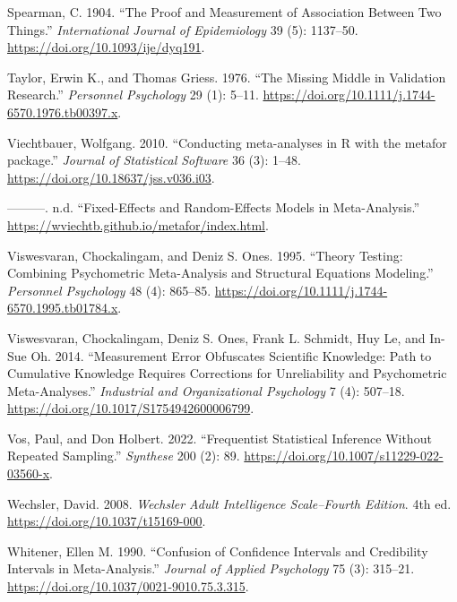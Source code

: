 \documentclass[
  letterpaper,
  DIV=11,
  numbers=noendperiod]{scrreprt}
\newlength{\cslhangindent}
\newlength{\cslentryspacingunit} %
\newenvironment{CSLReferences}[2] %
 {%
  \setlength{\parindent}{0pt}
  \ifodd #1
  \let\oldpar\par
  \def\par{\hangindent=\cslhangindent\oldpar}
  \fi
  \setlength{\parskip}{#2\cslentryspacingunit}
 }%
 {}
\begin{document}
\begin{CSLReferences}{1}{0}
\leavevmode{}%
Spearman, C. 1904. {``The Proof and Measurement of Association Between
Two Things.''} \emph{International Journal of Epidemiology} 39 (5):
1137--50. \url{https://doi.org/10.1093/ije/dyq191}.

\leavevmode{}%
Taylor, Erwin K., and Thomas Griess. 1976. {``The Missing Middle in
Validation Research.''} \emph{Personnel Psychology} 29 (1): 5--11.
\url{https://doi.org/10.1111/j.1744-6570.1976.tb00397.x}.

\leavevmode{}%
Viechtbauer, Wolfgang. 2010. {``Conducting meta-analyses in R with the
metafor package.''} \emph{Journal of Statistical Software} 36 (3):
1--48. \url{https://doi.org/10.18637/jss.v036.i03}.

\leavevmode{}%
---------. n.d. {``Fixed-Effects and Random-Effects Models in
Meta-Analysis.''} \url{https://wviechtb.github.io/metafor/index.html}.

\leavevmode{}%
Viswesvaran, Chockalingam, and Deniz S. Ones. 1995. {``Theory Testing:
Combining Psychometric Meta-Analysis and Structural Equations
Modeling.''} \emph{Personnel Psychology} 48 (4): 865--85.
\url{https://doi.org/10.1111/j.1744-6570.1995.tb01784.x}.

\leavevmode{}%
Viswesvaran, Chockalingam, Deniz S. Ones, Frank L. Schmidt, Huy Le, and
In-Sue Oh. 2014. {``Measurement Error Obfuscates Scientific Knowledge:
Path to Cumulative Knowledge Requires Corrections for Unreliability and
Psychometric Meta-Analyses.''} \emph{Industrial and Organizational
Psychology} 7 (4): 507--18.
\url{https://doi.org/10.1017/S1754942600006799}.

\leavevmode{}%
Vos, Paul, and Don Holbert. 2022. {``Frequentist Statistical Inference
Without Repeated Sampling.''} \emph{Synthese} 200 (2): 89.
\url{https://doi.org/10.1007/s11229-022-03560-x}.

\leavevmode{}%
Wechsler, David. 2008. \emph{Wechsler Adult Intelligence Scale--Fourth
Edition}. 4th ed. \url{https://doi.org/10.1037/t15169-000}.

\leavevmode{}%
Whitener, Ellen M. 1990. {``Confusion of Confidence Intervals and
Credibility Intervals in Meta-Analysis.''} \emph{Journal of Applied
Psychology} 75 (3): 315--21.
\url{https://doi.org/10.1037/0021-9010.75.3.315}.


\end{CSLReferences}
\end{document}
